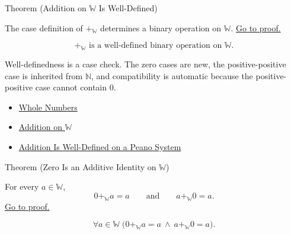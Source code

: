 \begin{theorembox}{Theorem (Addition on \texorpdfstring{$\mathbb{W}$}{W} Is Well-Defined)}
\begin{theorem}
\label{thm:addition-on-w-well-defined}
The case definition of $+_{\mathbb{W}}$ determines a binary operation on
$\mathbb{W}$.
\hyperref[prf:addition-on-w-well-defined]{Go to proof.}
\end{theorem}
\end{theorembox}

\begin{remark*}
\[
+_{\mathbb{W}}\text{ is a well-defined binary operation on }\mathbb{W}.
\]
\end{remark*}

\begin{remark*}[Interpretation]
Well-definedness is a case check. The zero cases are new, the
positive-positive case is inherited from $\mathbb{N}$, and compatibility is
automatic because the positive-positive case cannot contain $0$.
\end{remark*}

\begin{dependencies}
\begin{itemize}
  \item \hyperref[def:whole-numbers]{Whole Numbers}
  \item \hyperref[def:addition-on-w]{Addition on $\mathbb{W}$}
  \item \hyperref[thm:addition-well-defined-on-peano-system]{Addition Is Well-Defined on a Peano System}
\end{itemize}
\end{dependencies}

\begin{theorembox}{Theorem (Zero Is an Additive Identity on \texorpdfstring{$\mathbb{W}$}{W})}
\begin{theorem}
\label{thm:zero-additive-identity-on-w}
For every $a\in\mathbb{W}$,
\[
0+_{\mathbb{W}}a=a
\qquad\text{and}\qquad
a+_{\mathbb{W}}0=a.
\]
\hyperref[prf:zero-additive-identity-on-w]{Go to proof.}
\end{theorem}
\end{theorembox}

\begin{remark*}
\[
\forall a\in\mathbb{W}\;
\bigl(0+_{\mathbb{W}}a=a\ \wedge\ a+_{\mathbb{W}}0=a\bigr).
\]
\end{remark*}

